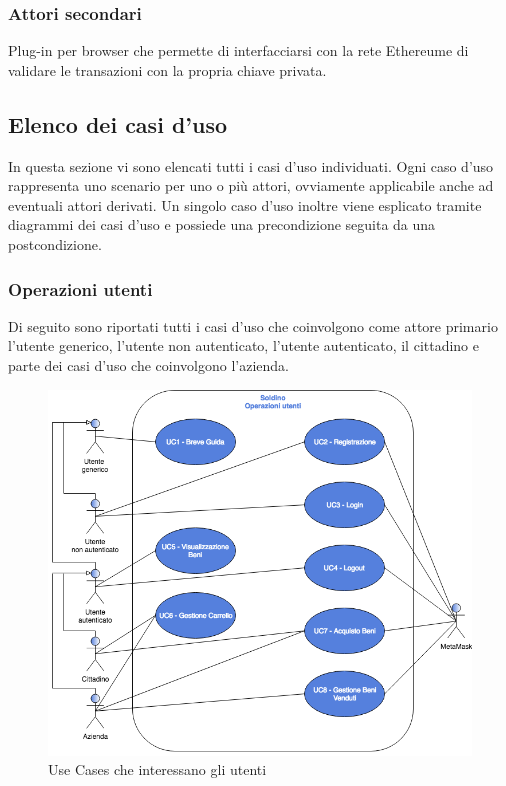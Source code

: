 \subsubsection{Attori secondari}
\begin{description}[style=nextline]
	\item[MetaMask]
	Plug-in per browser che permette di interfacciarsi con la rete Ethereum\glosp e di validare le transazioni con la propria chiave privata.
	
\end{description}

\subsection{Elenco dei casi d'uso}
In questa sezione vi sono elencati tutti i casi d'uso individuati. Ogni caso d'uso rappresenta uno scenario per uno o più attori, ovviamente applicabile anche ad eventuali attori derivati. Un singolo caso d'uso inoltre viene esplicato tramite diagrammi dei casi d'uso e possiede una precondizione seguita da una postcondizione.
\subsubsection*{Operazioni utenti}
Di seguito sono riportati tutti i casi d'uso che coinvolgono come attore primario l'utente generico, l'utente non autenticato, l'utente autenticato, il cittadino e parte dei casi d'uso che coinvolgono l'azienda.

\begin{figure}[H]
	\includegraphics[width=12cm]{res/images/UseCase1-8.png}
	\centering
	\caption{Use Cases che interessano gli utenti}
\end{figure}







